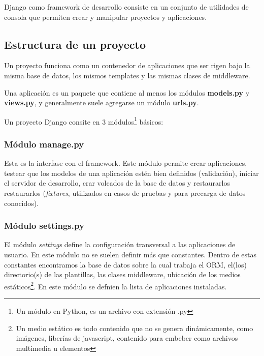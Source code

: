 \documentclass[a4paper]{report}
\begin{document}
Django como framework de desarrollo consiste en un  conjunto de utilidades 
de consola que permiten crear y manipular proyectos y aplicaciones.

\subsection*{Estructura de un proyecto}
Un proyecto funciona como un contenedor de aplicaciones que ser rigen bajo
la misma base de datos, los mismos templates y las mismas clases de middleware.

Una aplicación es un paquete que contiene al menos los módulos \textbf{models.py} y \textbf{views.py}, 
y generalmente suele agregarse un módulo \textbf{urls.py}.





Un \label{django:proyecto}{proyecto} Django consite en 3 módulos\footnote{Un módulo en Python, es un
archivo con extensión .py} básicos:
\subsubsection*{Módulo manage.py}
  Esta es la interfase con el framework. Este módulo permite crear aplicaciones,
testear que los modelos de una aplicación estén bien definidos (validación),
iniciar el servidor de desarrollo, crar volcados de la base de datos y restaurarlos
restaurarlos (\emph{fixtures}, utilizados en casos de pruebas y para precarga
de datos conocidos).

\subsubsection*{Módulo settings.py}
  El módulo \emph{settings} define la configuración transversal
a las aplicaciones de usuario. En este módulo no se suelen definir más que constantes.
Dentro de estas constantes encontramos la base de datos sobre la cual trabaja el ORM, 
el(los) directorio(s) de las plantillas, las clases middleware,
ubicación de los medios estáticos\footnote{
Un medio estático es todo contenido que no se genera dinámicamente, como imágenes, 
liberías de javascript, contenido para embeber como archivos multimedia u elementos}.
En este módulo se defnien la lista de aplicaciones instaladas.
\end{document}
